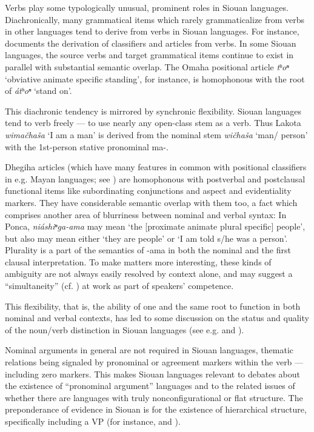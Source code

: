 \begin{refsection}
Verbs play some typologically unusual, prominent roles in Siouan languages. Diachronically, many grammatical items which rarely grammaticalize from verbs in other languages tend to derive from verbs in Siouan languages. For instance, \citet{Rankin1977} documents the derivation of classifiers and articles from verbs. In some Siouan languages, the source verbs and target grammatical items continue to exist in parallel with substantial semantic overlap. The Omaha positional article \textit{tʰoⁿ} `obviative animate specific standing', for instance, is homophonous with the root of \textit{\'atʰoⁿ} `stand on'.


This diachronic tendency is mirrored by synchronic flexibility. Siouan languages tend to verb freely --- to use nearly any open-class stem as a verb. Thus Lakota \textit{wima\v{c}ha\v{s}a} `I am a man' is derived from the nominal stem \textit{wi\v{c}ha\v{s}a} `man/ person' with the 1st-person stative pronominal ma-.

Dhegiha articles (which have many features in common with positional classifiers in e.g. Mayan languages; see \citealt{Gordon2009}) are homophonous with postverbal and postclausal functional items like subordinating conjunctions and aspect and evidentiality markers. They have considerable semantic overlap with them too, a fact which comprises another area of blurriness between nominal and verbal syntax: In Ponca, \textit{ni\'ashiⁿga-ama} may mean `the [proximate animate plural specific] people', but also may mean either `they are people' or `I am told s/he was a person'. Plurality is a part of the semantics of -ama in both the nominal and the first clausal interpretation. To make matters more interesting, these kinds of ambiguity are not always easily resolved by context alone, and may suggest a ``simultaneity'' (cf. \citealt{Woolard1998}) at work as part of speakers' competence. 


This flexibility, that is, the ability of one and the same root to function in both nominal and verbal contexts, has led to some discussion on the status and quality of the noun/verb distinction in Siouan languages (see e.g. \citealt{Helmbrecht2002}  and \citet{Ingham2001}). 

Nominal arguments in general are not required in Siouan languages, thematic relations being signaled by pronominal or agreement markers within the verb --- including zero markers. This makes Siouan languages relevant to debates about the existence of ``pronominal argument'' languages \citep{Jelinek1984} and to the related issues of whether there are languages with truly nonconfigurational or flat structure. The preponderance of evidence in Siouan is for the existence of hierarchical structure, specifically including a VP (for instance, \citealt{West1998,JohnsonTV, JohnsonEtAlTV} and \citealt{RosenTV}).



\end{refsection}
